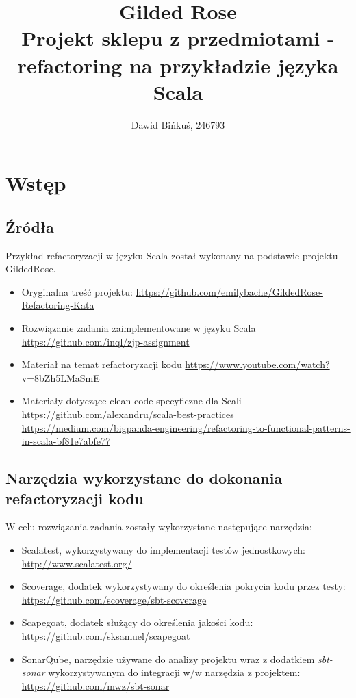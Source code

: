 \documentclass[a4paper, 11pt]{article}
\title{%
  Gilded Rose \\
  \large Projekt sklepu z przedmiotami - refactoring na przykładzie języka Scala}
\author{Dawid Bińkuś, 246793}
\begin{document}
\maketitle
\section{Wstęp}
\subsection{Źródła}
Przykład refactoryzacji w języku Scala został wykonany na podstawie projektu GildedRose.
\begin{itemize}
	\item Oryginalna treść projektu: \href{https://github.com/emilybache/GildedRose-Refactoring-Kata}{https://github.com/emilybache/GildedRose-Refactoring-Kata}
	\item Rozwiązanie zadania zaimplementowane w języku Scala \\\href{https://github.com/inql/zjp-assignment}{https://github.com/inql/zjp-assignment}
	\item Materiał na temat refactoryzacji kodu \href{https://www.youtube.com/watch?v=8bZh5LMaSmE}{https://www.youtube.com/watch?v=8bZh5LMaSmE}
	\item Materiały dotyczące clean code specyficzne dla Scali \href{https://github.com/alexandru/scala-best-practices}{https://github.com/alexandru/scala-best-practices}\\
	\href{https://medium.com/bigpanda-engineering/refactoring-to-functional-patterns-in-scala-bf81e7abfe77}{https://medium.com/bigpanda-engineering/refactoring-to-functional-patterns-in-scala-bf81e7abfe77}
\end{itemize}
\subsection{Narzędzia wykorzystane do dokonania refactoryzacji kodu}
W celu rozwiązania zadania zostały wykorzystane następujące narzędzia:
\begin{itemize}
 \item Scalatest, wykorzystywany do implementacji testów jednostkowych: \href{http://www.scalatest.org/}{http://www.scalatest.org/}
 \item Scoverage, dodatek wykorzystywany do określenia pokrycia kodu przez testy:\\ \href{https://github.com/scoverage/sbt-scoverage}{https://github.com/scoverage/sbt-scoverage}
 \item Scapegoat, dodatek służący do określenia jakości kodu: \href{https://github.com/sksamuel/scapegoat}{https://github.com/sksamuel/scapegoat}
 \item SonarQube, narzędzie używane do analizy projektu wraz z dodatkiem \textit{sbt-sonar} wykorzystywanym do integracji w/w narzędzia z projektem: \href{https://github.com/mwz/sbt-sonar}{https://github.com/mwz/sbt-sonar}
\end{itemize}
\end{document}
